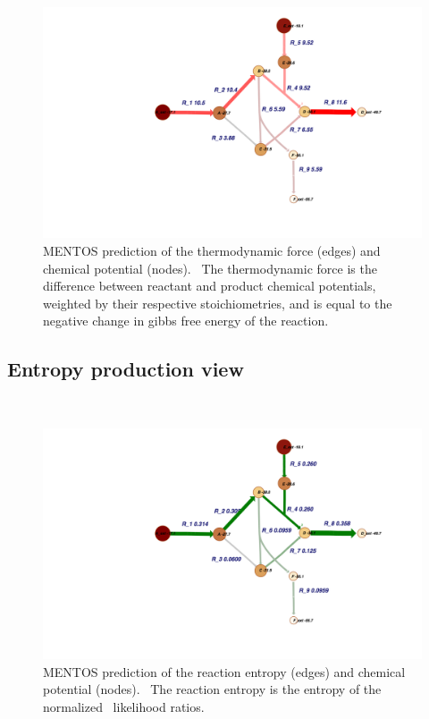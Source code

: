 \documentclass[10pt]{article}
\begin{document}
{\label{743024}}\par\null{}
\begin{figure}[h!]
\begin{center}
\includegraphics[width=1.00\columnwidth]{figures/ABC-energy-view/ABC_energy_view}
\caption{{MENTOS prediction of the thermodynamic force (edges) and chemical
potential (nodes).~ The thermodynamic force is the difference between
reactant and product chemical potentials, weighted by their respective
stoichiometries, and is equal to the negative change in gibbs free
energy of the reaction.
{\label{505463}}%
}}
\end{center}
\end{figure}

\subsection{Entropy production view}

{\label{803579}}

~
\begin{figure}[h!]
\begin{center}
\includegraphics[width=1.00\columnwidth]{figures/ABC-entropy-view/ABC_entropy_view}
\caption{{MENTOS prediction of the reaction entropy (edges) and chemical potential
(nodes).~ The reaction entropy is the entropy of the normalized~
likelihood ratios.
{\label{893275}}%
}}
\end{center}
\end{figure}

\par\null\par\null

\clearpage
\nocite{*}



\end{document}
